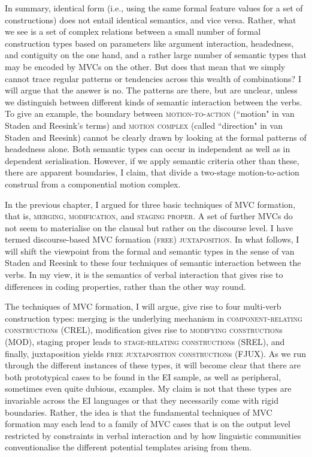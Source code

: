 In summary, identical form (i.e., using the same formal feature values for a set of constructions) does not entail identical semantics, and vice versa. Rather, what we see is a set of complex relations between a small number of formal construction types based on parameters like argument interaction, headedness, and contiguity on the one hand, and a rather large number of semantic types that may be encoded by MVCs on the other. But does that mean that we simply cannot trace regular patterns or tendencies across this wealth of combinations? I will argue that the answer is no. The patterns are there, but are unclear, unless we distinguish between different kinds of semantic interaction between the verbs. To give an example, the boundary between \textsc{motion-to-action} (``motion" in van Staden and Reesink's terms) and \textsc{motion complex} (called ``direction" in van Staden and Reesink) cannot be clearly drawn by looking at the formal patterns of headedness alone. Both semantic types can occur in independent as well as in dependent serialisation. However, if we apply semantic criteria other than these, there are apparent boundaries, I claim, that divide a two-stage motion-to-action construal from a componential motion complex. 

In the previous chapter, I argued for three basic techniques of MVC formation, that is, \textsc{merging}, \textsc{modification}, and \textsc{staging proper}. A set of further MVCs do not seem to materialise on the clausal but rather on the discourse level. I have termed discourse-based MVC formation \textsc{(free) juxtaposition}. In what follows, I will shift the viewpoint from the formal and semantic types in the sense of van Staden and Reesink to these four techniques of semantic interaction between the verbs. In my view, it is the semantics of verbal interaction that gives rise to differences in coding properties, rather than the other way round. 

The techniques of MVC formation, I will argue, give rise to four multi-verb construction types: merging is the underlying mechanism in \textsc{component-relating construction}s (CREL), modification gives rise to \textsc{modifying construction}s (MOD), staging proper leads to \textsc{stage-relating construction}s (SREL), and finally, juxtaposition yields \textsc{free juxtaposition construction}s (FJUX). As we run through the different instances of these types, it will become clear that there are both prototypical cases to be found in the EI sample, as well as peripheral, sometimes even quite dubious, examples. My claim is not that these types are invariable across the EI languages or that they necessarily come with rigid boundaries. Rather, the idea is that the fundamental techniques of MVC formation may each lead to a family of MVC cases that is on the output level restricted by constraints in verbal interaction and by how linguistic communities conventionalise the different potential templates arising from them. 

